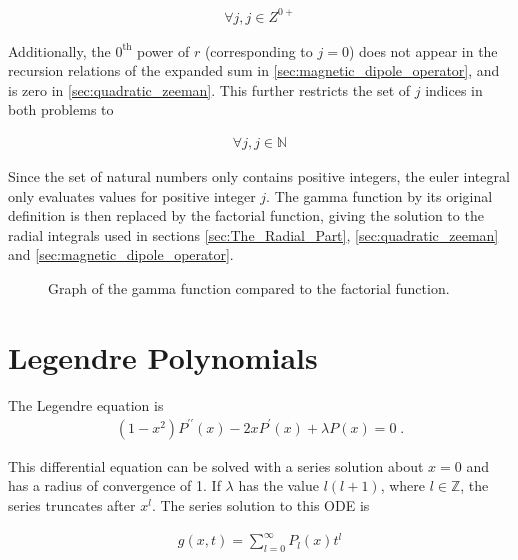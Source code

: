         \begin{align}
            \forall j, j \in Z^{0+}
        \end{align}

        \noindent Additionally, the $0^{\text{th}}$ power of $r$ (corresponding to $j = 0$) does not appear in the recursion relations of the expanded sum in \ref{sec:magnetic_dipole_operator}, and is zero in \ref{sec:quadratic_zeeman}. This further restricts the set of $j$ indices in both problems to 

        \begin{align}
            \forall j, j\in \mathbb{N}
        \end{align}

        \noindent Since the set of natural numbers only contains positive integers, the euler integral only evaluates values for positive integer $j$. The gamma function by its original definition is then replaced by the factorial function, giving the solution to the radial integrals used in sections \ref{sec:The_Radial_Part}, \ref{sec:quadratic_zeeman} and \ref{sec:magnetic_dipole_operator}. 

        \begin{figure}[ht!]
            \centering
            \resizebox{0.8\linewidth}{!}{}
            \caption{Graph of the gamma function compared to the factorial function.}
            \label{img:Gamma_fn_graph}
        \end{figure}

    \section{Legendre Polynomials} \label{sec:Legendre_Polynomial}
        The Legendre equation is 
        \begin{align}
            (1 - x^2)P^{\prime \prime}(x) -2xP^\prime(x) + \lambda P(x) = 0\;.
        \end{align}

        \noindent This differential equation can be solved with a series solution about $x = 0$ and has a radius of convergence of 1. If $\lambda$ has the value $l(l+1)$, where $l \in \mathbb{Z}$, the series truncates after $x^{l}$. The series solution to this ODE is 

        \begin{align}
            g(x, t) = \sum_{l = 0}^\infty P_l(x) t^l 
        \end{align}

